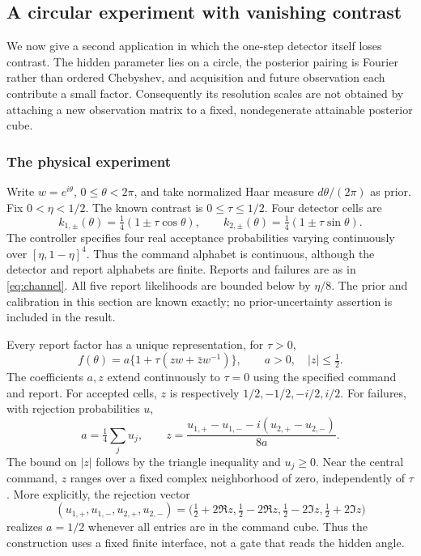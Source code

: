 \subsection{A circular experiment with vanishing contrast}
\label{sec:circular}
We now give a second application in which the one-step detector itself
loses contrast. The hidden parameter lies on a circle, the posterior
pairing is Fourier rather than ordered Chebyshev, and acquisition and
future observation each contribute a small factor. Consequently its
resolution scales are not obtained by attaching a new observation
matrix to a fixed, nondegenerate attainable posterior cube.

\subsubsection{The physical experiment}
Write $w=e^{i\theta}$, $0\le\theta<2\pi$, and take normalized Haar
measure $d\theta/(2\pi)$ as prior. Fix $0<\eta<1/2$. The known
contrast is $0\le\tau\le1/2$. Four detector cells are
\begin{equation}\label{eq:circle-cells}
 k_{1,\pm}(\theta)=\tfrac14(1\pm\tau\cos\theta),\qquad
 k_{2,\pm}(\theta)=\tfrac14(1\pm\tau\sin\theta).
\end{equation}
The controller specifies four real acceptance probabilities varying
continuously over $[\eta,1-\eta]^4$. Thus the command alphabet is
continuous, although the detector and report alphabets are finite. Reports and failures are as in
\eqref{eq:channel}. All five report likelihoods are bounded below by
$\eta/8$. The prior and calibration in this section are known exactly;
no prior-uncertainty assertion is included in the result.

Every report factor has a unique representation, for $\tau>0$,
\begin{equation}\label{eq:circle-factor}
 f(\theta)=a\{1+\tau(z w+\bar z w^{-1})\},
 \qquad a>0,\quad |z|\le\tfrac12.
\end{equation}
The coefficients $a,z$ extend continuously to $\tau=0$ using the
specified command and report. For accepted cells, $z$ is respectively
$1/2,-1/2,-i/2,i/2$. For failures, with rejection probabilities $u$,
\begin{equation}\label{eq:circle-command-coordinates}
 a=\tfrac14\sum_j u_j,\qquad
 z=\frac{u_{1,+}-u_{1,-}-i(u_{2,+}-u_{2,-})}{8a}.
\end{equation}
The bound on $|z|$ follows by the triangle inequality and $u_j\ge0$.
Near the central command, $z$ ranges over a fixed complex neighborhood
of zero, independently of $\tau$. More explicitly, the rejection vector
\begin{equation}\label{eq:circle-right-inverse}
 (u_{1,+},u_{1,-},u_{2,+},u_{2,-})
 =\bigl(\tfrac12+2\Re z,\tfrac12-2\Re z,
        \tfrac12-2\Im z,\tfrac12+2\Im z\bigr)
\end{equation}
realizes $a=1/2$ whenever all entries are in the command cube.
Thus the construction uses a fixed finite interface, not a gate that
reads the hidden angle.

